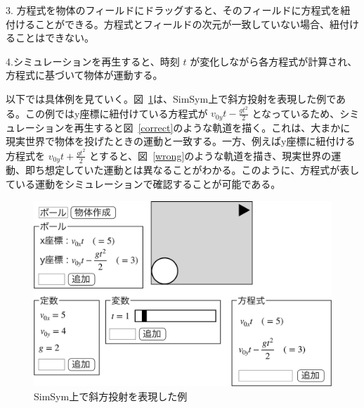 \documentclass[11pt, a4paper, oneside, twocolumn, dvipdfmx]{jsarticle}
\newcommand{\simname}{SimSym}
\begin{document}
3. 方程式を物体のフィールドにドラッグすると、そのフィールドに方程式を紐付けることができる。方程式とフィールドの次元が一致していない場合、紐付けることはできない。

4.シミュレーションを再生すると、時刻 $t$ が変化しながら各方程式が計算され、方程式に基づいて物体が運動する。

以下では具体例を見ていく。図~\ref{simsym_fig1}は、\simname 上で斜方投射を表現した例である。この例ではy座標に紐付けている方程式が $v_{0y}t - \frac{gt^2}{2}$ となっているため、シミュレーションを再生すると図~\ref{correct}のような軌道を描く。これは、大まかに現実世界で物体を投げたときの運動と一致する。一方、例えばy座標に紐付ける方程式を $v_{0y}t + \frac{gt^2}{2}$ とすると、図~\ref{wrong}のような軌道を描き、現実世界の運動、即ち想定していた運動とは異なることがわかる。このように、方程式が表している運動をシミュレーションで確認することが可能である。

\begin{figure}[htb]
  \centering
  \includegraphics*[width=0.9\linewidth]{work/slide_img3-crop.pdf}
  \caption{\simname 上で斜方投射を表現した例} \label{simsym_fig1}
\end{figure}
\end{document}
